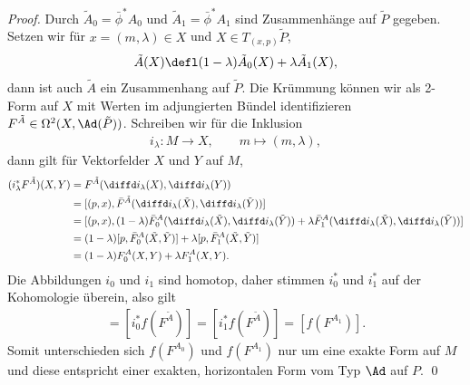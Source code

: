 \documentclass[%
	paper=a5,%
	fleqn,%
	DIV=18,%
	BCOR=0mm,
	fontsize=11pt,
	titlepage=false,%
	bibliography=totoc,
	DIV=18,%
	twoside=true,
	pdftitle=Riemannsche Geometrie,
	pdfauthor=Uwe Semmelmann,
	numbers=noendperiod]%
	{scrbook}
\begin{document}
\begin{proof}
{}

\noindent
Durch $\tilde{A}_0 = \bar{\phi}^*A_0$ und  $\tilde{A}_1 = \bar{\phi}^*A_1$ sind
Zusammenhänge auf $\tilde{P}$ gegeben.
Setzen wir für $x=(m,\lambda)\in X$ und $X\in T_{(x,p)}\tilde{P}$,
\begin{align*}
\tilde{A}(X) \defl (1-\lambda)\tilde{A}_0(X) + \lambda\tilde{A}_1(X),
\end{align*}
dann ist auch $\tilde{A}$ ein Zusammenhang auf $\tilde{P}$. Die Krümmung
 können wir als 2-Form auf $X$ mit Werten im adjungierten Bündel
identifizieren $F^{\tilde{A}}\in\Omega^2(X,\Ad(\tilde{P}))$. Schreiben wir für
die Inklusion
\begin{align*}
i_\lambda: M\to X,\qquad m\mapsto (m,\lambda),
\end{align*}
dann gilt für Vektorfelder $X$ und $Y$ auf $M$,
\begin{align*}
(i_\lambda^* F^{\tilde{A}})(X,Y) &= 
F^{\tilde{A}}(\diffd i_\lambda(X),\diffd i_\lambda(Y))\\
&= 
[(p,x),\bar{F}^{\tilde{A}}(\diffd i_\lambda(\tilde{X}),\diffd
i_\lambda(\tilde{Y}))]\\
&= 
[(p,x),(1-\lambda)\bar{F}^A_0(\diffd i_\lambda(\tilde{X}),\diffd
i_\lambda(\tilde{Y})) + 
\lambda \bar{F}^A_1(\diffd i_\lambda(\tilde{X}),\diffd i_\lambda(\tilde{Y}))
]\\
&=
(1-\lambda)[p,\bar{F}^A_0(\tilde{X},\tilde{Y})] +
\lambda[p,\bar{F}^A_1(\tilde{X},\tilde{Y})]\\
&=
(1-\lambda)F^A_0(X,Y) + \lambda F^{A}_1(X,Y).
\end{align*}
Die Abbildungen $i_0$ und $i_1$ sind homotop, daher stimmen $i_0^*$ und $i_1^*$
auf der Kohomologie überein, also gilt
\begin{align*}
[f(F^{A_0})] = [i_0^*f(F^{\tilde{A}})] = [i_1^*f(F^{\tilde{A}})] = 
[f(F^{A_1})].
\end{align*}
Somit unterschieden sich $f(F^{A_0})$ und $f(F^{A_1})$ nur um eine exakte Form
auf $M$ und diese entspricht einer exakten, horizontalen Form vom Typ
$\Ad$ auf $P$.
%
%
%
%
\qed
\end{proof}
\end{document}
